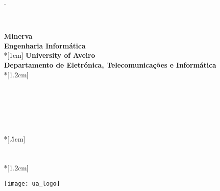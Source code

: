 \thispagestyle{empty}             %
\calccentering{\unitlength}
\begin{adjustwidth*}{\unitlength}{-\unitlength}
    \begin{adjustwidth}{-0.5cm}{-0.5cm}
        \sffamily
        \begin{flushright}
            \\
        \end{flushright}
        \vspace*{\fill}
        \noindent
        \HUGE \textbf{Minerva}\\
        \Huge \textbf{Engenharia Informática}\\*[1cm]
        \LARGE \textbf{University of Aveiro}\\
        \LARGE \textbf{Departamento de Eletrónica, Telecomunicações e Informática}\\*[1.2cm]
        \parbox[b]{0.5\linewidth}{%
            \large {}\\
            \LARGE {}\\
            \LARGE {}\\
            \LARGE {}\\
            \LARGE {}
            \\*[.5cm]
            \large {}\\
            \LARGE {} \Large {}\\
            \\*[1.2cm]
            \Large
            \the\year
        }
        
        \hfill\texttt{[image: ua\_logo]}
    \end{adjustwidth}
\end{adjustwidth*}
\normalfont
\normalsize
